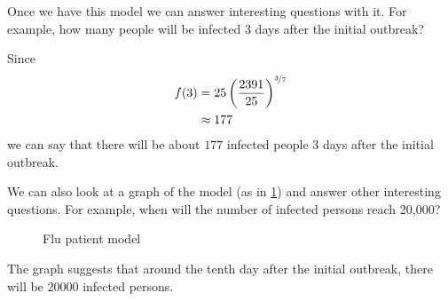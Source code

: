\begin{pccexample}
	Once we have this model we can answer interesting questions with it.  For example, how many people will be infected $3$ days 
	after the initial outbreak?  
	\begin{pccsolution} 
		Since 
		\begin{align*}
			f(3) & = 25\left(\frac{2391}{25}\right)^{\nicefrac{3}7} \\
			     & \approx 177                                      
		\end{align*}
		we can say that there will be about $177$ infected people $3$ days after the initial outbreak.
	\end{pccsolution}
										
	We can also look at a graph of the model (as in \cref{exp:fig:flugraph}) and answer other interesting questions.  For 
	example, when will the number of infected persons reach 20,000?  
	\begin{figure}[!htb]
		\centering
		\caption{Flu patient model}
		\label{exp:fig:flugraph}
	\end{figure}
	\begin{pccsolution} 
		The graph suggests that around the tenth day after the initial outbreak, there will be $20000$ infected persons.
	\end{pccsolution}
\end{pccexample}
			
